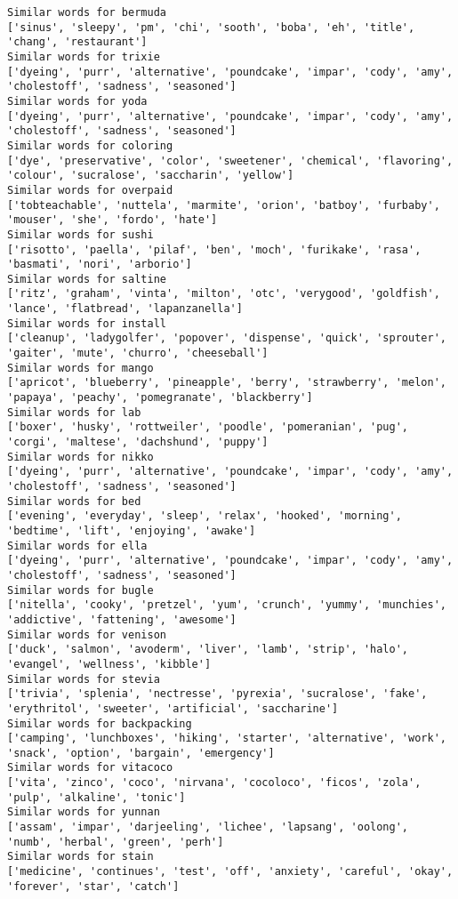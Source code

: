 \documentclass[11pt]{article}
\begin{document}
\begin{Verbatim}[commandchars=\\\{\}]
Similar words for bermuda
['sinus', 'sleepy', 'pm', 'chi', 'sooth', 'boba', 'eh', 'title', 'chang', 'restaurant']
Similar words for trixie
['dyeing', 'purr', 'alternative', 'poundcake', 'impar', 'cody', 'amy', 'cholestoff', 'sadness', 'seasoned']
Similar words for yoda
['dyeing', 'purr', 'alternative', 'poundcake', 'impar', 'cody', 'amy', 'cholestoff', 'sadness', 'seasoned']
Similar words for coloring
['dye', 'preservative', 'color', 'sweetener', 'chemical', 'flavoring', 'colour', 'sucralose', 'saccharin', 'yellow']
Similar words for overpaid
['tobteachable', 'nuttela', 'marmite', 'orion', 'batboy', 'furbaby', 'mouser', 'she', 'fordo', 'hate']
Similar words for sushi
['risotto', 'paella', 'pilaf', 'ben', 'moch', 'furikake', 'rasa', 'basmati', 'nori', 'arborio']
Similar words for saltine
['ritz', 'graham', 'vinta', 'milton', 'otc', 'verygood', 'goldfish', 'lance', 'flatbread', 'lapanzanella']
Similar words for install
['cleanup', 'ladygolfer', 'popover', 'dispense', 'quick', 'sprouter', 'gaiter', 'mute', 'churro', 'cheeseball']
Similar words for mango
['apricot', 'blueberry', 'pineapple', 'berry', 'strawberry', 'melon', 'papaya', 'peachy', 'pomegranate', 'blackberry']
Similar words for lab
['boxer', 'husky', 'rottweiler', 'poodle', 'pomeranian', 'pug', 'corgi', 'maltese', 'dachshund', 'puppy']
Similar words for nikko
['dyeing', 'purr', 'alternative', 'poundcake', 'impar', 'cody', 'amy', 'cholestoff', 'sadness', 'seasoned']
Similar words for bed
['evening', 'everyday', 'sleep', 'relax', 'hooked', 'morning', 'bedtime', 'lift', 'enjoying', 'awake']
Similar words for ella
['dyeing', 'purr', 'alternative', 'poundcake', 'impar', 'cody', 'amy', 'cholestoff', 'sadness', 'seasoned']
Similar words for bugle
['nitella', 'cooky', 'pretzel', 'yum', 'crunch', 'yummy', 'munchies', 'addictive', 'fattening', 'awesome']
Similar words for venison
['duck', 'salmon', 'avoderm', 'liver', 'lamb', 'strip', 'halo', 'evangel', 'wellness', 'kibble']
Similar words for stevia
['trivia', 'splenia', 'nectresse', 'pyrexia', 'sucralose', 'fake', 'erythritol', 'sweeter', 'artificial', 'saccharine']
Similar words for backpacking
['camping', 'lunchboxes', 'hiking', 'starter', 'alternative', 'work', 'snack', 'option', 'bargain', 'emergency']
Similar words for vitacoco
['vita', 'zinco', 'coco', 'nirvana', 'cocoloco', 'ficos', 'zola', 'pulp', 'alkaline', 'tonic']
Similar words for yunnan
['assam', 'impar', 'darjeeling', 'lichee', 'lapsang', 'oolong', 'numb', 'herbal', 'green', 'perh']
Similar words for stain
['medicine', 'continues', 'test', 'off', 'anxiety', 'careful', 'okay', 'forever', 'star', 'catch']

\end{Verbatim}
\end{document}
